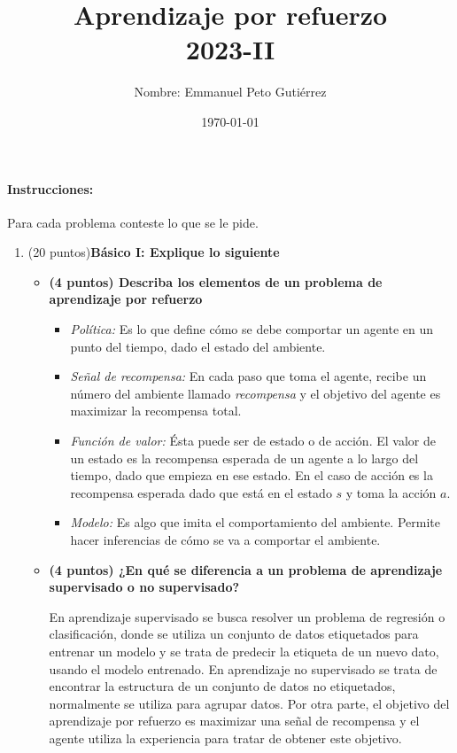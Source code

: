 \documentclass[a4paper,10pt]{article}
\title{Aprendizaje por refuerzo\\2023-II}
\author{Nombre: Emmanuel Peto Gutiérrez}
\date{\today}
\begin{document}
\maketitle

\paragraph{Instrucciones:} Para cada problema conteste lo que se le pide.

\begin{enumerate}
    \item (20 puntos)\textbf{Básico I: Explique lo siguiente}
    \begin{itemize}
        \item \textbf{(4 puntos) Describa los elementos de un problema de aprendizaje por refuerzo}
        
        \begin{itemize}
            \item \textit{Política:} Es lo que define cómo se debe comportar un agente en un punto del tiempo, dado el estado del ambiente.
            \item \textit{Señal de recompensa:} En cada paso que toma el agente, recibe un número del ambiente llamado \textit{recompensa} y el objetivo del agente es maximizar la recompensa total.
            \item \textit{Función de valor:} Ésta puede ser de estado o de acción. El valor de un estado es la recompensa esperada de un agente a lo largo del tiempo, dado que empieza en ese estado. En el caso de acción es la recompensa esperada dado que está en el estado $s$ y toma la acción $a$.
            \item \textit{Modelo:} Es algo que imita el comportamiento del ambiente. Permite hacer inferencias de cómo se va a comportar el ambiente.
        \end{itemize}
        
        \item \textbf{(4 puntos) ¿En qué se diferencia a un problema de aprendizaje supervisado o no supervisado?}
        
        En aprendizaje supervisado se busca resolver un problema de regresión o clasificación, donde se utiliza un conjunto de datos etiquetados para entrenar un modelo y se trata de predecir la etiqueta de un nuevo dato, usando el modelo entrenado. En aprendizaje no supervisado se trata de encontrar la estructura de un conjunto de datos no etiquetados, normalmente se utiliza para agrupar datos. Por otra parte, el objetivo del aprendizaje por refuerzo es maximizar una señal de recompensa y el agente utiliza la experiencia para tratar de obtener este objetivo.
        

\end{itemize}
\end{enumerate}
\end{document}
